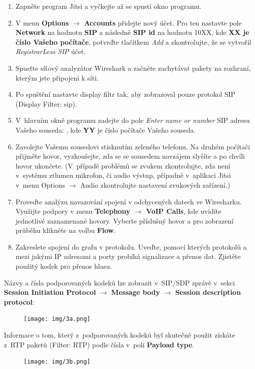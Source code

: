 \begin{enumerate}
    \item Zapněte program Jitsi a vyčkejte až se spustí okno programu.
    \item V menu {\bf Options} $\rightarrow$ {\bf Accounts} přidejte nový účet. Pro ten nastavte pole {\bf Network} na hodnotu {\bf SIP} a následně {\bf SIP id} na hodnotu 10XX, kde {\bf XX je číslo Vašeho počítače}, potvrďte tlačítkem {\it Add} a zkontrolujte, že se vytvořil {\it RegistrarLess SIP} účet.
    \item Spusťte síťový analyzátor Wireshark a začněte zachytávat pakety na rozhraní, kterým jste připojeni k síti.
    \item Po spuštění nastavte display filtr tak, aby zobrazoval pouze protokol
      SIP (Display Filter: sip).
    \item V hlavním okně programu zadejte do pole {\it Enter name or number} SIP adresu Vašeho souseda: , kde {\bf YY} je číslo počítače Vašeho souseda.
    \item Zavolejte Vašemu sousedovi stisknutím zeleného telefonu. Na druhém počítači přijměte hovor, vyzkoušejte, zda se se sousedem navzájem slyšíte a po chvíli hovor ukončete.
(V případě problémů se zvukem zkontrolujte, zda není v systému ztlumen mikrofon, či audio výstup, případně v aplikaci Jitsi v menu Options $\rightarrow$ Audio zkontrolujte nastavení zvukových zařízení.) 
    \item Proveďte analýzu navazování spojení v odchycených datech ve Wiresharku. Využijte podpory v menu {\bf Telephony $\rightarrow$ VoIP Calls}, kde uvidíte jednotlivé zaznamenané hovory. Vyberte příslušný hovor a pro zobrazení průběhu klikněte na volbu {\bf Flow}.
    \item Zakreslete spojení do grafu v protokolu. Uveďte, pomocí kterých protokolů a mezi jakými IP adresami a porty probíhá signalizace a přenos dat. Zjistěte použitý kodek pro přenos hlasu.
\end{enumerate}
Názvy a čísla podporovaných kodeků lze zobrazit v SIP/SDP zprávě v sekci {\bf Session Initiation Protocol} $\rightarrow$ {\bf Message body} $\rightarrow$ {\bf Session description protocol}:
\begin{figure}[h!]
  \centering
  \texttt{[image: img/3a.png]}
\end{figure}

\noindent Informace o tom, který z podporovaných kodeků byl skutečně použit získáte z RTP paketů (Filter: RTP) podle čísla v poli {\bf Payload type}.
\begin{figure}[h!]
  \centering
  \texttt{[image: img/3b.png]}
\end{figure}



